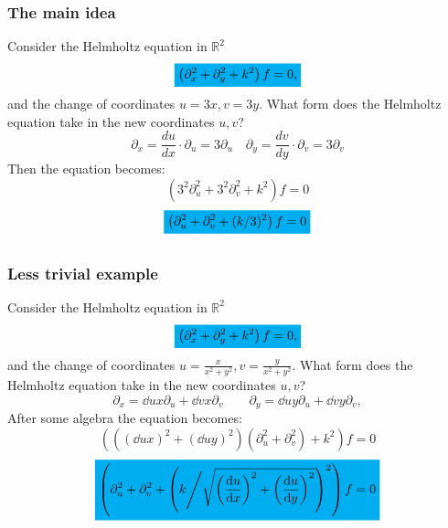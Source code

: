 \documentclass{beamer}
\newcommand{\highlightcyan}[1]{\colorbox{cyan}{$\displaystyle #1$}}
\begin{document}
\begin{frame}
\frametitle{The main idea}
Consider the Helmholtz equation in $\mathbb{R}^2$
\begin{equation*}
	\highlightcyan{\left(\partial^2_x+\partial^2_y+k^2\right)f=0,}
\end{equation*}
and the change of coordinates \(u=3x,v=3y\).
\newline
\newline
\pause
What form does the Helmholtz equation take in the new coordinates \(u,v\)?
\pause
\begin{equation*}
\partial_x=\frac{du}{dx}\cdot\partial_u=3\partial_u\quad
\partial_y=\frac{dv}{dy}\cdot\partial_v=3\partial_v
\end{equation*}
\pause
Then the equation becomes:
\begin{equation*}
	\left(3^2\partial^2_u+3^2\partial^2_v+k^2\right)f=0
\end{equation*}
\begin{equation*}
	\highlightcyan{\left(\partial^2_u+\partial^2_v+(k/3)^2\right)f=0}
\end{equation*}
\begin{equation*}
\end{equation*}
\end{frame}

\begin{frame}
\frametitle{Less trivial example}
Consider the Helmholtz equation in $\mathbb{R}^2$
\begin{equation*}
	\highlightcyan{\left(\partial^2_x+\partial^2_y+k^2\right)f=0,}
\end{equation*}
and the change of coordinates \(u=\frac{x}{x^2+y^2}, v=\frac{y}{x^2+y^2}\).
\newline
\newline
\pause
What form does the Helmholtz equation take in the new coordinates \(u,v\)?
\pause
\begin{equation*}
	\partial_x=\dd{u}{x}\partial_u + \dd{v}{x}\partial_v \qquad
	\partial_y=\dd{u}{y}\partial_u + \dd{v}{y}\partial_v,
\end{equation*}
\pause
After some algebra the equation becomes:
\begin{equation*}
\left(
\left(\left(\dd{u}{x}\right)^2
+\left(\dd{u}{y}\right)^2\right)
\left(\partial_u^2+\partial_v^2\right)+ k^2\right)f=0
\end{equation*}
\begin{equation*}
\highlightcyan{\left(
	\partial_u^2+\partial_v^2
	+\left(
	k\middle/\sqrt{\left(\dd{u}{x}\right)^2
	+\left(\dd{u}{y}\right)^2}
	\right)^2
\right)f=0}
\end{equation*}
\end{frame}
\end{document}
